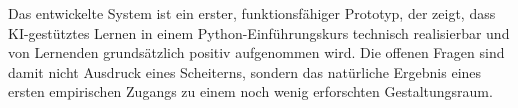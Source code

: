 Das entwickelte System ist ein erster, funktionsfähiger Prototyp, der zeigt, dass KI-gestütztes Lernen in einem Python-Einführungskurs technisch realisierbar und von Lernenden grundsätzlich positiv aufgenommen wird. Die offenen Fragen sind damit nicht Ausdruck eines Scheiterns, sondern das natürliche Ergebnis eines ersten empirischen Zugangs zu einem noch wenig erforschten Gestaltungsraum.



